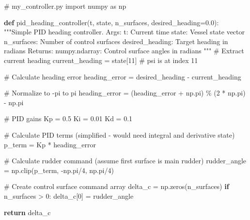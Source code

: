 \documentclass[
  letterpaper,
  DIV=11,
  numbers=noendperiod]{scrreprt}
\newenvironment{Shaded}{\begin{snugshade}}{\end{snugshade}}
\newcommand{\CommentTok}[1]{\textcolor[rgb]{0.37,0.37,0.37}{#1}}
\newcommand{\ControlFlowTok}[1]{\textcolor[rgb]{0.00,0.23,0.31}{\textbf{#1}}}
\newcommand{\DecValTok}[1]{\textcolor[rgb]{0.68,0.00,0.00}{#1}}
\newcommand{\FloatTok}[1]{\textcolor[rgb]{0.68,0.00,0.00}{#1}}
\newcommand{\ImportTok}[1]{\textcolor[rgb]{0.00,0.46,0.62}{#1}}
\newcommand{\KeywordTok}[1]{\textcolor[rgb]{0.00,0.23,0.31}{\textbf{#1}}}
\newcommand{\NormalTok}[1]{\textcolor[rgb]{0.00,0.23,0.31}{#1}}
\newcommand{\OperatorTok}[1]{\textcolor[rgb]{0.37,0.37,0.37}{#1}}
\begin{document}
\begin{Shaded}
\begin{Highlighting}[]
\CommentTok{\# my\_controller.py}
\ImportTok{import}\NormalTok{ numpy }\ImportTok{as}\NormalTok{ np}

\KeywordTok{def}\NormalTok{ pid\_heading\_controller(t, state, n\_surfaces, desired\_heading}\OperatorTok{=}\FloatTok{0.0}\NormalTok{):}
    \CommentTok{"""Simple PID heading controller.}
\CommentTok{    }
\CommentTok{    Args:}
\CommentTok{        t: Current time}
\CommentTok{        state: Vessel state vector}
\CommentTok{        n\_surfaces: Number of control surfaces}
\CommentTok{        desired\_heading: Target heading in radians}
\CommentTok{        }
\CommentTok{    Returns:}
\CommentTok{        numpy.ndarray: Control surface angles in radians}
\CommentTok{    """}
    \CommentTok{\# Extract current heading}
\NormalTok{    current\_heading }\OperatorTok{=}\NormalTok{ state[}\DecValTok{11}\NormalTok{]  }\CommentTok{\# psi is at index 11}
    
    \CommentTok{\# Calculate heading error}
\NormalTok{    heading\_error }\OperatorTok{=}\NormalTok{ desired\_heading }\OperatorTok{{-}}\NormalTok{ current\_heading}
    
    \CommentTok{\# Normalize to {-}pi to pi}
\NormalTok{    heading\_error }\OperatorTok{=}\NormalTok{ (heading\_error }\OperatorTok{+}\NormalTok{ np.pi) }\OperatorTok{\%}\NormalTok{ (}\DecValTok{2} \OperatorTok{*}\NormalTok{ np.pi) }\OperatorTok{{-}}\NormalTok{ np.pi}
    
    \CommentTok{\# PID gains}
\NormalTok{    Kp }\OperatorTok{=} \FloatTok{0.5}
\NormalTok{    Ki }\OperatorTok{=} \FloatTok{0.01}
\NormalTok{    Kd }\OperatorTok{=} \FloatTok{0.1}
    
    \CommentTok{\# Calculate PID terms (simplified {-} would need integral and derivative state)}
\NormalTok{    p\_term }\OperatorTok{=}\NormalTok{ Kp }\OperatorTok{*}\NormalTok{ heading\_error}
    
    \CommentTok{\# Calculate rudder command (assume first surface is main rudder)}
\NormalTok{    rudder\_angle }\OperatorTok{=}\NormalTok{ np.clip(p\_term, }\OperatorTok{{-}}\NormalTok{np.pi}\OperatorTok{/}\DecValTok{4}\NormalTok{, np.pi}\OperatorTok{/}\DecValTok{4}\NormalTok{)}
    
    \CommentTok{\# Create control surface command array}
\NormalTok{    delta\_c }\OperatorTok{=}\NormalTok{ np.zeros(n\_surfaces)}
    \ControlFlowTok{if}\NormalTok{ n\_surfaces }\OperatorTok{\textgreater{}} \DecValTok{0}\NormalTok{:}
\NormalTok{        delta\_c[}\DecValTok{0}\NormalTok{] }\OperatorTok{=}\NormalTok{ rudder\_angle}
    
    \ControlFlowTok{return}\NormalTok{ delta\_c}
\end{Highlighting}
\end{Shaded}
\end{document}
